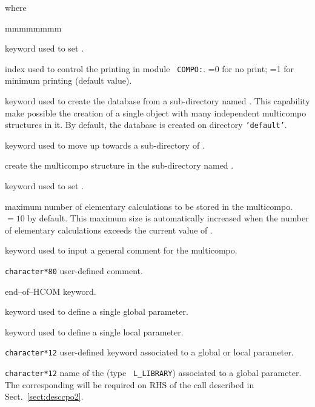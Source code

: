 \noindent where
\begin{ListeDeDescription}{mmmmmmmm}

\item[\moc{EDIT}] keyword used to set .

\item[\dusa{iprint}] index used to control the printing in module {\tt
COMPO:}. =0 for no print; =1 for minimum printing (default value).

\item[\moc{STEP}] keyword used to create the database from a sub-directory named . This capability
make possible the creation of a single object with many independent {\sc multicompo} structures in it. By default,
the database is created on directory {\tt 'default'}.

\item[\moc{UP}] keyword used to move up towards a sub-directory of .

\item[\dusa{NAMDIR}] create the {\sc multicompo} structure in the sub-directory named .

\item[\moc{MAXCAL}] keyword used to set .

\item[\dusa{maxcal}] maximum number of elementary calculations to be stored
in the {\sc multicompo}. $=10$ by default. This maximum size is
automatically increased when the number of elementary calculations exceeds
the current value of .

\item[\moc{COMM}] keyword used to input a general comment for the {\sc multicompo}.

\item[\dusa{HCOM}] {\tt character*80} user-defined comment.

\item[\moc{ENDC}] end--of--HCOM keyword.

\item[\moc{PARA}] keyword used to define a single global parameter.

\item[\moc{LOCA}] keyword used to define a single local parameter.

\item[\dusa{PARKEY}] {\tt character*12} user-defined keyword associated to a global
or local parameter.

\item[\dusa{HMIC}] {\tt character*12} name of the  (type {\tt
L\_LIBRARY}) associated to a global parameter. The corresponding  will be required on
RHS of the  call described in Sect.~\ref{sect:desccpo2}.


\end{ListeDeDescription}
